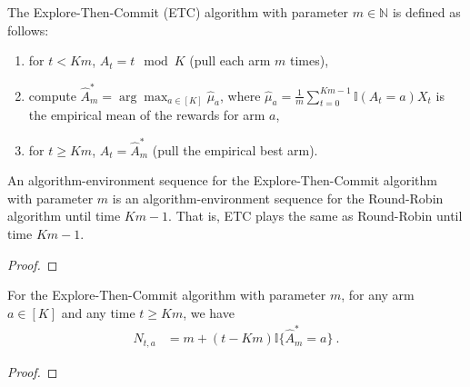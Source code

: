 \begin{definition}\label{def:etcAlgorithm}
  \leanok
The Explore-Then-Commit (ETC) algorithm with parameter $m \in \mathbb{N}$ is defined as follows:
\begin{enumerate}
  \item for $t < Km$, $A_t = t \mod K$ (pull each arm $m$ times),
  \item compute $\hat{A}_m^* = \arg\max_{a \in [K]} \hat{\mu}_a$, where $\hat{\mu}_a = \frac{1}{m} \sum_{t=0}^{Km-1} \mathbb{I}(A_t = a) X_t$ is the empirical mean of the rewards for arm $a$,
  \item for $t \ge Km$, $A_t = \hat{A}_m^*$ (pull the empirical best arm).
\end{enumerate}
\end{definition}


\begin{lemma}\label{lem:ETC.isAlgEnvSeqUntil_roundRobinAlgorithm}
  \leanok
An algorithm-environment sequence for the Explore-Then-Commit algorithm with parameter $m$ is an algorithm-environment sequence for the Round-Robin algorithm until time $Km - 1$.
That is, ETC plays the same as Round-Robin until time $Km - 1$.
\end{lemma}

\begin{proof}
  \leanok

\end{proof}


\begin{lemma}\label{lem:pullCount_etcAlgorithm}
  \leanok
For the Explore-Then-Commit algorithm with parameter $m$, for any arm $a \in [K]$ and any time $t \ge Km$, we have
\begin{align*}
  N_{t,a}
  &= m + (t - Km) \mathbb{I}\{\hat{A}_m^* = a\}
  \: .
\end{align*}
\end{lemma}

\begin{proof}\leanok

\end{proof}


